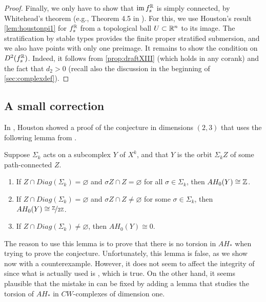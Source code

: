 \documentclass[a4paper,12pt]{amsart}
\begin{document}
\begin{proof}
Finally, we only have to show that $\operatorname{im} f_s^{\mathbb{R}}$ is simply connected, by Whitehead's theorem (e.g., Theorem 4.5 in \cite{Hatcher2002}). For this, we use Houston's result \cref{lem:houstonpi1} for $f_s^{\mathbb{R}}$ from a topological ball $U\subset \mathbb{R}^n$ to its image. The stratification by stable types provides the finite proper stratified submersion, and we also have points with only one preimage. It remains to show the condition on $D^2(f_s^{\mathbb{R}})$. Indeed, it follows from \cref{prop:draftXIII} (which holds in any corank) and the fact that $d_2>0$ (recall also the discussion in the beginning of \cref{sec:complexdef}).
\end{proof}

\subsection{A small correction}\label{sec:houston}
In \cite[Theorem 5.5]{Houston2005}, Houston showed a proof of the conjecture in dimensions $(2,3)$ that uses the following lemma from \cite{Houston1997}.

\begin{lemma}
Suppose $\Sigma_k$ acts on a subcomplex $Y$ of $X^k$, and that $Y$ is the orbit $\Sigma_k Z$ of some path-connected $Z$.
\begin{enumerate}[label=(\roman*)]
	\item If $Z\cap Diag(\Sigma_k)=\varnothing$ and $\sigma Z\cap Z=\varnothing$ for all $\sigma\in\Sigma_k$, then $AH_0(Y)\cong\mathbb{Z}$.
   \item\label{it:iicounterexample} If $Z\cap Diag(\Sigma_k)=\varnothing$ and $\sigma Z\cap Z\neq\varnothing$ for some $\sigma\in\Sigma_k$, then $AH_0(Y)\cong\nicefrac{\mathbb{Z}}{2\mathbb{Z}}$.
   \item If $Z\cap Diag(\Sigma_k)\neq\varnothing$, then $AH_0(Y)\cong0$.
\end{enumerate}
\end{lemma}

The reason to use this lemma is to prove that there is no torsion in $AH_*$ when trying to prove the conjecture. Unfortunately, this lemma is false, as we show now with a counterexample. However, it does not seem to affect the integrity of \cite{Houston1997} since what is actually used is \cite[Remark 2.7]{Houston1997}, which is true. On the other hand, it seems plausible that the mistake in \cite[Theorem 5.5]{Houston2005} can be fixed by adding a lemma that studies the torsion of $AH_*$ in $CW$-complexes of dimension one.
\end{document}
